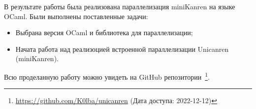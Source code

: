 

В результате работы была реализована параллелизация miniKanren на языке OCaml.
Были выполнены поставленные задачи:


\begin{itemize}
\item Выбрана версия OCaml и библиотека для параллелизации;
\item Начата работа над реализоцией встроенной параллелизации Unicanren (miniKanren).
\end{itemize}

Всю проделанную работу можно увидеть на GitHub репозитории~\footnote{\url{https://github.com/K0lba/unicanren} (Дата доступа: 2022-12-12)}.





